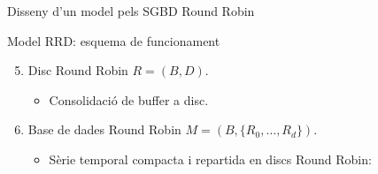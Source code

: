 \begin{frame}{Disseny d'un model pels SGBD Round Robin}
\begin{textblock*}{50mm}


\end{textblock*}



\end{frame}


\begin{frame}{Model RRD: esquema de funcionament}

\begin{enumerate}
\setcounter{enumi}{4}
\item Disc Round Robin $R=(B,D)$. 
\begin{itemize}
\item Consolidació de buffer a disc.
\end{itemize}
\item Base de dades Round Robin $M=(B,\{R_0,\ldots,R_d \})$. 
\begin{itemize}
\item Sèrie temporal compacta i repartida en discs Round Robin:
\end{itemize}
\end{enumerate}




\begin{center}
       \tiny
       \setlength{\unitlength}{0.2mm}
%       
       \normalsize
\end{center}






\end{frame}



